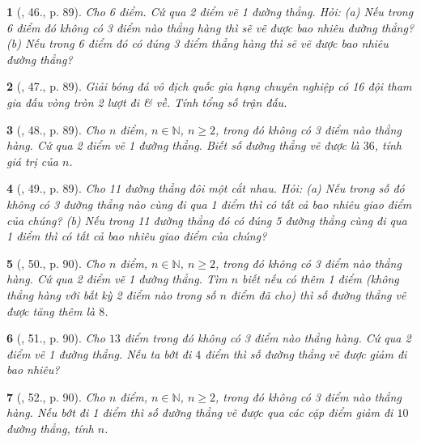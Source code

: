\documentclass{article}
\newtheorem{baitoan}{}
\begin{document}
\begin{baitoan}[\cite{Tuyen_Toan_6}, 46., p. 89]
	Cho 6 điểm. Cứ qua 2 điểm vẽ 1 đường thẳng. Hỏi: (a) Nếu trong 6 điểm đó không có 3 điểm nào thẳng hàng thì sẽ vẽ được bao nhiêu đường thẳng? (b) Nếu trong 6 điểm đó có đúng 3 điểm thẳng hàng thì sẽ vẽ được bao nhiêu đường thẳng?
\end{baitoan}

\begin{baitoan}[\cite{Tuyen_Toan_6}, 47., p. 89]
	Giải bóng đá vô địch quốc gia hạng chuyên nghiệp có 16 đội tham gia đấu vòng tròn 2 lượt đi \& về. Tính tổng số trận đấu.
\end{baitoan}

\begin{baitoan}[\cite{Tuyen_Toan_6}, 48., p. 89]
	Cho $n$ điểm, $n\in\mathbb{N}$, $n\ge2$, trong đó không có 3 điểm nào thẳng hàng. Cứ qua 2 điểm vẽ 1 đường thẳng. Biết số đường thẳng vẽ được là $36$, tính giá trị của $n$.
\end{baitoan}

\begin{baitoan}[\cite{Tuyen_Toan_6}, 49., p. 89]
	Cho 11 đường thẳng đôi một cắt nhau. Hỏi: (a) Nếu trong số đó không có 3 đường thẳng nào cùng đi qua 1 điểm thì có tất cả bao nhiêu giao điểm của chúng? (b) Nếu trong 11 đường thẳng đó có đúng 5 đường thẳng cùng đi qua 1 điểm thì có tất cả bao nhiêu giao điểm của chúng?
\end{baitoan}

\begin{baitoan}[\cite{Tuyen_Toan_6}, 50., p. 90]
	Cho $n$ điểm, $n\in\mathbb{N}$, $n\ge2$, trong đó không có 3 điểm nào thẳng hàng. Cứ qua 2 điểm vẽ 1 đường thẳng. Tìm $n$ biết nếu có thêm 1 điểm (không thẳng hàng với bất kỳ 2 điểm nào trong số $n$ điểm đã cho) thì số đường thẳng vẽ được tăng thêm là $8$.
\end{baitoan}

\begin{baitoan}[\cite{Tuyen_Toan_6}, 51., p. 90]
	Cho $13$ điểm trong đó không có 3 điểm nào thẳng hàng. Cứ qua 2 điểm vẽ 1 đường thẳng. Nếu ta bớt đi $4$ điểm thì số đường thẳng vẽ được giảm đi bao nhiêu?
\end{baitoan}

\begin{baitoan}[\cite{Tuyen_Toan_6}, 52., p. 90]
	Cho $n$ điểm, $n\in\mathbb{N}$, $n\ge2$, trong đó không có 3 điểm nào thẳng hàng. Nếu bớt đi 1 điểm thì số đường thẳng vẽ được qua các cặp điểm giảm đi $10$ đường thẳng, tính $n$.
\end{baitoan}
\end{document}
